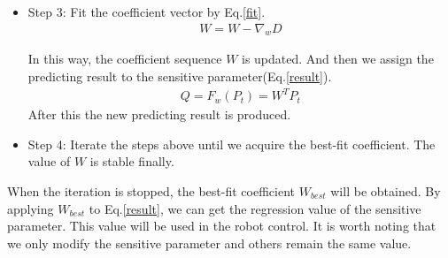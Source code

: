 \begin{itemize}
	\item Step 3: Fit the coefficient vector by Eq.\ref{fit}.
	\begin{eqnarray}\label{fit}
	W=W-\nabla_{w}D
	\end{eqnarray}
	
	In this way, the coefficient sequence $W$ is updated. And then we assign the predicting result to the sensitive parameter(Eq.\ref{result}).
	\begin{eqnarray}\label{result}
	Q=F_{w}(P_{t})=W^{T}P_{t}
	\end{eqnarray}
	After this the new predicting result is produced.
	
	\item Step 4: Iterate the steps above until we acquire the best-fit coefficient. The value of $W$ is stable finally.
\end{itemize}

When the iteration is stopped, the best-fit coefficient $W_{best}$ will be obtained. By applying $W_{best}$ to Eq.\ref{result}, we can get the regression value of the sensitive parameter. This value will be used in the robot control. It is worth noting that we only modify the sensitive parameter and others remain the same value.